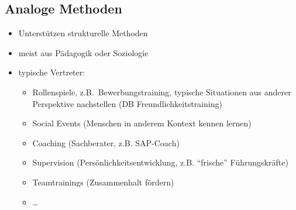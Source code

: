 \documentclass[a4paper, 12pt]{article}
\begin{document}
\subsection{Analoge Methoden}
\begin{itemize}
  \item Unterstützen strukturelle Methoden
  \item meist aus Pädagogik oder Soziologie
  \item typische Vertreter:
    \begin{itemize}
      \item Rollenspiele, z.B.\ Bewerbungstraining, typische Situationen aus anderer Perspektive nachstellen (DB Freundlichkeitstraining)
      \item Social Events (Menschen in anderem Kontext kennen lernen)
      \item Coaching (Sachberater, z.B. SAP-Coach)
      \item Supervision (Persönlichkeitsentwicklung, z.B. ``frische'' Führungskräfte)
      \item Teamtrainings (Zusammenhalt fördern)
      \item \ldots
    \end{itemize}
\end{itemize}
\end{document}

